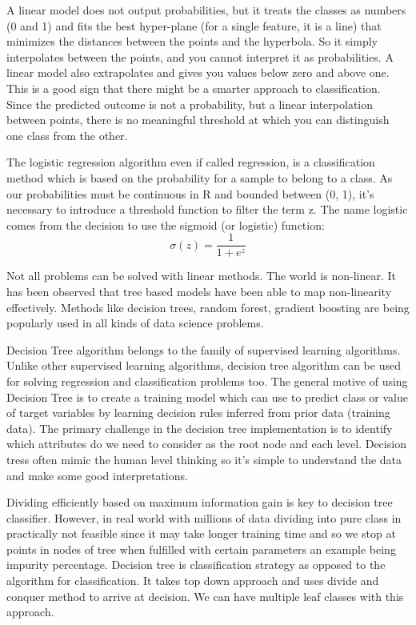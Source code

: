 \documentclass[12pt]{article}
\begin{document}
A linear model does not output probabilities, but it treats the classes as numbers (0 and 1) and fits the best hyper-plane (for a single feature, it is a line) that minimizes the distances between the points and the hyperbola. So it simply interpolates between the points, and you cannot interpret it as probabilities. A linear model also extrapolates and gives you values below zero and above one. This is a good sign that there might be a smarter approach to classification. Since the predicted outcome is not a probability, but a linear interpolation between points, there is no meaningful threshold at which you can distinguish one class from the other. 

The logistic regression algorithm even if called regression, is a classification method which is based on the probability for
a sample to belong to a class. As our probabilities must be continuous in R and bounded between (0, 1), it's necessary to introduce a threshold function to filter the term z. The name logistic comes from the decision to use the sigmoid (or logistic) function:
$$\sigma(z) = \dfrac{1}{1+e^z}$$


Not all problems can be solved with linear methods. The world is non-linear. It has been observed that tree based models have been able to map non-linearity effectively. Methods like decision trees, random forest, gradient boosting are being popularly used in all kinds of data science problems.

Decision Tree algorithm belongs to the family of supervised learning algorithms. Unlike other supervised learning algorithms, decision tree algorithm can be used for solving regression and classification problems too. The general motive of using Decision Tree is to create a training model which can use to predict class or value of target variables by learning decision rules inferred from prior data (training data). The primary challenge in the decision tree implementation is to identify which attributes do we need to consider as the root node and each level. Decision tress often mimic the human level thinking so it’s simple to understand the data and make some good interpretations.

Dividing efficiently based on maximum information gain is key to decision tree classifier. However, in real world with millions of data dividing into pure class in practically not feasible since it may take longer training time and so we stop at points in nodes of tree when fulfilled with certain parameters an example being impurity percentage. Decision tree is classification strategy as opposed to the algorithm for classification. It takes top down approach and uses divide and conquer method to arrive at decision. We can have multiple leaf classes with this approach.
\end{document}
